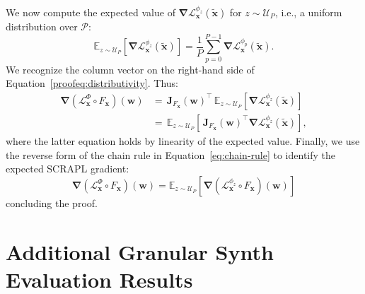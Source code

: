 \documentclass{article} %
\theoremstyle{plain}
\theoremstyle{definition}
\theoremstyle{remark}
\begin{document}
We now compute the expected value of $\boldsymbol{\nabla}\mathcal{L}_{\boldsymbol{x}}^{\phi_z}(\boldsymbol{\tilde{x}})$ for $z\sim\mathcal{U}_P$, i.e., a uniform distribution over $\mathcal{P}$:
\begin{equation}
\mathbb{E}_{z\sim\mathcal{U}_P}\left[
\boldsymbol{\nabla}\mathcal{L}_{\boldsymbol{x}}^{\phi_z}(\boldsymbol{\tilde{x}})
\right] = \dfrac{1}{P}
\sum_{p=0}^{P-1} \boldsymbol{\nabla}\mathcal{L}_{\boldsymbol{x}}^{\phi_p}(\boldsymbol{\tilde{x}}).
\end{equation}
We recognize the column vector on the right-hand side of Equation~\ref{proofeq:distributivity}.
Thus:
\begin{align}
\boldsymbol{\nabla}(\mathcal{L}_{\boldsymbol{x}}^{\Phi}\circ F_{\boldsymbol{x}})(\boldsymbol{w}) 
&= \, \mathbf{J}_{F_{\boldsymbol{x}}}(\boldsymbol{w})^{\top} \, \mathbb{E}_{z\sim\mathcal{U}_P}\left[
\boldsymbol{\nabla}\mathcal{L}_{\boldsymbol{x}}^{\phi_z}(\boldsymbol{\tilde{x}})
\right] \nonumber \\
&= \, \mathbb{E}_{z\sim\mathcal{U}_P}\left[
\, \mathbf{J}_{F_{\boldsymbol{x}}}(\boldsymbol{w})^{\top} \boldsymbol{\nabla}\mathcal{L}_{\boldsymbol{x}}^{\phi_z}(\boldsymbol{\tilde{x}})
\right],
\end{align}
where the latter equation holds by linearity of the expected value.
Finally, we use the reverse form of the chain rule in Equation~\ref{eq:chain-rule} to identify the expected SCRAPL gradient:
\begin{equation}
\boldsymbol{\nabla}(\mathcal{L}_{\boldsymbol{x}}^{\Phi}\circ F_{\boldsymbol{x}})(\boldsymbol{w}) =
\mathbb{E}_{z\sim\mathcal{U}_P}\left[
\boldsymbol{\nabla}(\mathcal{L}_{\boldsymbol{x}}^{\phi_z}\circ F_{\boldsymbol{x}})(\boldsymbol{w})
\right]
\end{equation}
concluding the proof.

\clearpage


\section{Additional Granular Synth Evaluation Results}
\label{app:eval_results_granular}
\end{document}
